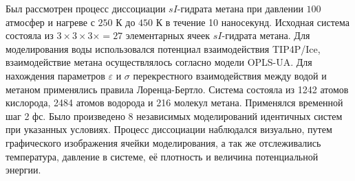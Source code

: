 Был рассмотрен процесс диссоциации $sI$-гидрата метана при давлении $100$ атмосфер и нагреве с $250$ К до $450$ К в течение 10 наносекунд. Исходная система состояла из $3\times 3\times 3\times=27$ элементарных ячеек $sI$-гидрата метана. Для моделирования воды использовался потенциал взаимодействия TIP4P/Ice, взаимодействие метана осуществлялось согласно модели OPLS-UA. Для нахождения параметров $\varepsilon$ и $\sigma$ перекрестного взаимодействия между водой и метаном применялись правила Лоренца-Бертло. Система состояла из 1242 атомов кислорода, 2484 атомов водорода и 216 молекул метана. Применялся временной шаг 2 фс. Было произведено 8 независимых моделирований идентичных систем при указанных условиях. Процесс диссоциации наблюдался визуально, путем графического изображения ячейки моделирования, а так же отслеживались температура, давление в системе, её плотность и величина потенциальной энергии. 

